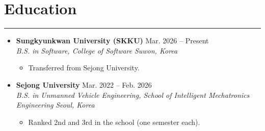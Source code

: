 \documentclass[letterpaper, 10pt]{article}
\begin{document}
\section*{Education}
\hrule
\vspace{4pt}

\begin{itemize}
    \item[]
    \textbf{Sungkyunkwan University (SKKU)} \hfill Mar. 2026 -- Present \\
    \textit{B.S. in Software, College of Software} \hfill \textit{Suwon, Korea}
    \begin{itemize}
        \item Transferred from Sejong University.
    \end{itemize}
    \item[]
    \textbf{Sejong University} \hfill Mar. 2022 -- Feb. 2026 \\
    \textit{B.S. in Unmanned Vehicle Engineering, School of Intelligent Mechatronics Engineering} \hfill \textit{Seoul, Korea}
    \begin{itemize}
        \item Ranked 2nd and 3rd in the school (one semester each).
    \end{itemize}
\end{itemize}
\end{document}
